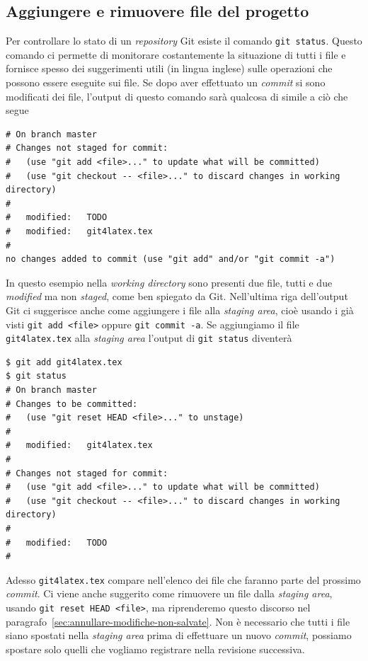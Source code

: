 \documentclass[a4paper,12pt,oneside]{article}
\begin{document}
\subsection{Aggiungere e rimuovere file del progetto}
\label{sec:aggiungere-rimuovere-file}

Per controllare lo stato di un \emph{repository} Git esiste il comando
\lstinline|git status|. Questo comando ci permette di monitorare costantemente
la situazione di tutti i file e fornisce spesso dei suggerimenti utili (in
lingua inglese) sulle operazioni che possono essere eseguite sui file. Se dopo
aver effettuato un \emph{commit} si sono modificati dei file, l'output di questo
comando sarà qualcosa di simile a ciò che segue
\begin{lstlisting}
# On branch master
# Changes not staged for commit:
#   (use "git add <file>..." to update what will be committed)
#   (use "git checkout -- <file>..." to discard changes in working directory)
#
#	modified:   TODO
#	modified:   git4latex.tex
#
no changes added to commit (use "git add" and/or "git commit -a")
\end{lstlisting}
In questo esempio nella \emph{working directory} sono presenti due file, tutti e
due \emph{modified} ma non \emph{staged}, come ben spiegato da Git. Nell'ultima
riga dell'output Git ci suggerisce anche come aggiungere i file alla
\emph{staging area}, cioè usando i già visti \lstinline|git add <file>| oppure
\lstinline|git commit -a|. Se aggiungiamo il file \lstinline|git4latex.tex| alla
\emph{staging area} l'output di \lstinline|git status| diventerà
\begin{lstlisting}
$ git add git4latex.tex
$ git status
# On branch master
# Changes to be committed:
#   (use "git reset HEAD <file>..." to unstage)
#
#	modified:   git4latex.tex
#
# Changes not staged for commit:
#   (use "git add <file>..." to update what will be committed)
#   (use "git checkout -- <file>..." to discard changes in working directory)
#
#	modified:   TODO
#
\end{lstlisting}
Adesso \lstinline|git4latex.tex| compare nell'elenco dei file che faranno parte
del prossimo \emph{commit}. Ci viene anche suggerito come rimuovere un file
dalla \emph{staging area}, usando \lstinline|git reset HEAD <file>|, ma
riprenderemo questo discorso nel
paragrafo~\ref{sec:annullare-modifiche-non-salvate}. Non è necessario che tutti
i file siano spostati nella \emph{staging area} prima di effettuare un nuovo
\emph{commit}, possiamo spostare solo quelli che vogliamo registrare nella
revisione successiva.
\end{document}
